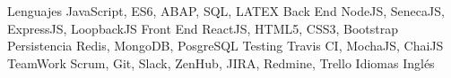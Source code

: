 


\begin{cvskills}

\cvskill
{Lenguajes} %
{JavaScript, ES6, ABAP, SQL, LATEX } %
\cvskill
{Back End} %
{NodeJS, SenecaJS, ExpressJS, LoopbackJS} %
\cvskill
{Front End} %
{ReactJS, HTML5, CSS3, Bootstrap} %
\cvskill
{Persistencia} %
{Redis, MongoDB, PosgreSQL} %
\cvskill
{Testing} %
{Travis CI, MochaJS, ChaiJS} %
\cvskill
{TeamWork} %
{Scrum, Git, Slack, ZenHub, JIRA, Redmine, Trello} %
\cvskill
{Idiomas} %
{Inglés} %
\end{cvskills}
